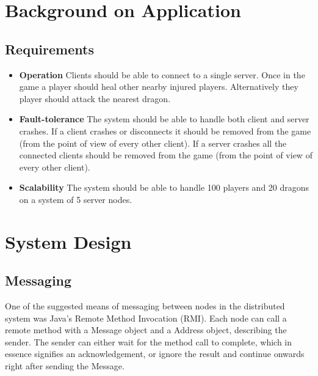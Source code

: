 \documentclass{article}
\begin{document}
\section{Background on Application}
\label{sec:background}

\subsection{Requirements}

\begin{itemize}
\item \textbf{Operation} Clients should be able to connect to a single server. Once in the game a player should heal other nearby injured players. Alternatively they player should attack the nearest dragon.
\item \textbf{Fault-tolerance} The system should be able to handle both client and server crashes. If a client crashes or disconnects it should be removed from the game (from the point of view of every other client). If a server crashes all the connected clients should be removed from the game (from the point of view of every other client).
\item \textbf{Scalability} The system should be able to handle 100 players and 20 dragons on a system of 5 server nodes.
\end{itemize}


\section{System Design}
\label{sec:design}

\subsection{Messaging}

One of the suggested means of messaging between nodes in the distributed system was Java's Remote Method Invocation (RMI). Each node can call a remote method with a Message object and a Address object, describing the sender. The sender can either wait for the method call to complete, which in essence signifies an acknowledgement, or ignore the result and continue onwards right after sending the Message. 
\end{document}
